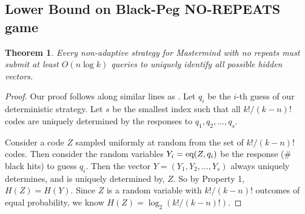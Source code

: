 \documentclass[12pt, a4paper]{article}
\newtheorem{theorem}{Theorem}
\begin{document}
\subsection{Lower Bound on Black-Peg NO-REPEATS game}
\begin{theorem}
Every non-adaptive strategy for Mastermind with no repeats must submit at least
$O(n \log k)$ queries to uniquely identify all possible hidden vectors.
\end{theorem}

\begin{proof}
Our proof follows along similar lines as \cite{DS13}. Let $q_i$ be the $i$-th
guess of our deterministic strategy. Let $s$ be the smallest index such that all
$k!/(k-n)!$ codes are uniquely determined by the responses to $q_1, q_2, \ldots, q_s$.

Consider a code $Z$ sampled uniformly at random from the set of $k!/(k-n)!$ codes. Then
consider the random variables $Y_i = \textnormal{eq}(Z, q_i)$ be the response (\# black
hits) to guess $q_i$.
Then the vector $Y = (Y_1,Y_2,\ldots,Y_s)$ always uniquely determines, and is uniquely
determined by, $Z$. So by Property 1, $H(Z) = H(Y)$. Since $Z$ is a random
variable with $k!/(k-n)!$ outcomes of equal probability, we know
$H(Z) = \log_2(k!/(k-n)!)$.


\end{proof}
\end{document}
